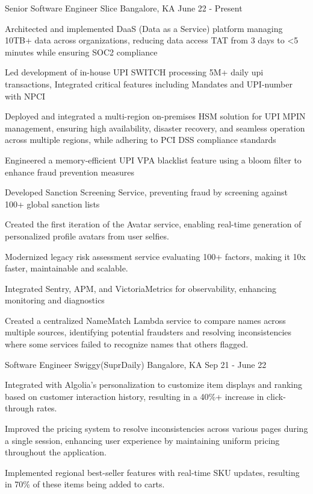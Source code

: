 \begin{cventries}
  \cventry
    {Senior Software Engineer}
    {Slice}
    {Bangalore, KA}
    {June 22 - Present}
    {
      \begin{cvitems}
        \item {Architected and implemented DaaS (Data as a Service) platform managing 10TB+ data across organizations,
        reducing data access TAT from 3 days to <5 minutes while ensuring SOC2 compliance}
        \item {Led development of in-house UPI SWITCH processing 5M+ daily upi transactions, Integrated critical features including Mandates and UPI-number with NPCI}
        \item {Deployed and integrated a multi-region on-premises HSM solution for UPI MPIN management, ensuring high availability,
        disaster recovery, and seamless operation across multiple regions, while adhering to PCI DSS compliance standards}
        \item {Engineered a memory-efficient UPI VPA blacklist feature using a bloom filter to enhance fraud prevention measures}
        \item {Developed Sanction Screening Service, preventing fraud by screening against 100+ global sanction lists}
        \item {Created the first iteration of the Avatar service, enabling real-time generation of personalized profile avatars from user selfies.}
        \item {Modernized legacy risk assessment service evaluating 100+ factors, making it 10x faster, maintainable and scalable.}
        \item {Integrated Sentry, APM, and VictoriaMetrics for observability, enhancing monitoring and diagnostics}
        \item {Created a centralized NameMatch Lambda service to compare names across multiple sources,
          identifying potential fraudsters and resolving inconsistencies where some services failed to recognize names that others flagged.}
      \end{cvitems}
    }
  
  \cventry
    {Software Engineer}
    {Swiggy(SuprDaily)}
    {Bangalore, KA}
    {Sep 21 - June 22}
    {
      \begin{cvitems}
        \item {Integrated with Algolia's personalization to customize item displays and ranking based on customer interaction history, resulting in a 40\%+ increase in click-through rates.}
        \item {Improved the pricing system to resolve inconsistencies across various pages during a single session, enhancing user experience by maintaining uniform pricing throughout the application.}
        \item {Implemented regional best-seller features with real-time SKU updates, resulting in 70\% of these items being added to carts.}
      \end{cvitems}
    }
  

\end{cventries}
